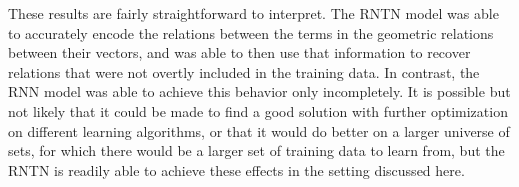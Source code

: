 




These results are fairly straightforward to interpret. The RNTN model
was able to accurately encode the relations between the terms in the
geometric relations between their vectors, and was able to then use
that information to recover relations that were not overtly included
in the training data. In contrast, the RNN model was able to achieve
this behavior only incompletely. It is possible but not likely that it
could be made to find a good solution with further optimization on
different learning algorithms, or that it would do better on a larger
universe of sets, for which there would be a larger set of training
data to learn from, but the RNTN is readily able to achieve these
effects in the setting discussed here.

